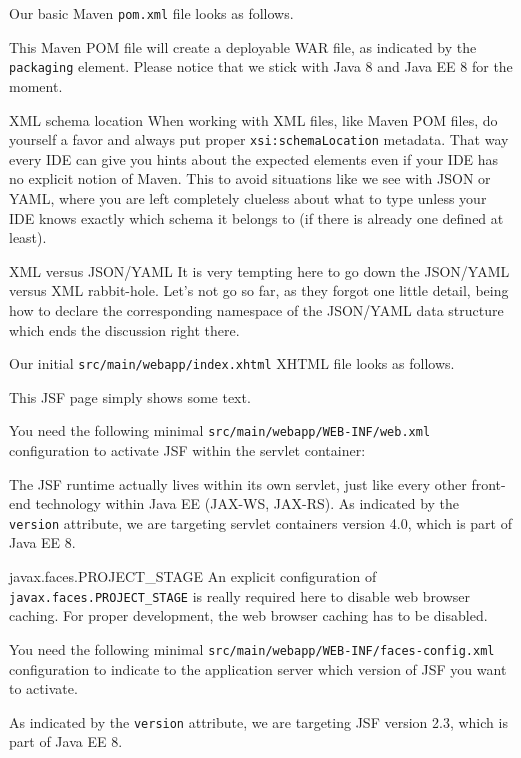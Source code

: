 Our basic Maven \cite{ApacheMaven} \texttt{pom.xml} file looks as follows.

This Maven POM file will create a deployable WAR file, as indicated by the \texttt{packaging} element.
Please notice that we stick with Java 8 \cite{GoslingJoyEtAl14} and Java EE 8 \cite{JavaEE8} for the moment.

\begin{TIP}{XML schema location}
	When working with XML files, like Maven POM files, do yourself a favor and always put proper \texttt{xsi:schemaLocation} metadata.
	That way every IDE can give you hints about the expected elements even if your IDE has no explicit notion of Maven.
	This to avoid situations like we see with JSON or YAML, where you are left completely clueless about what to type unless your IDE knows exactly which schema it belongs to (if there is already one defined at least).
\end{TIP}

\begin{ClownComputing}{XML versus JSON/YAML}
	It is very tempting here to go down the JSON/YAML versus XML rabbit-hole.
	Let's not go so far, as they forgot one little detail, being how to declare the corresponding namespace of the JSON/YAML data structure which ends the discussion right there.
\end{ClownComputing}

Our initial \texttt{src/main/webapp/index.xhtml} XHTML file looks as follows.

This JSF page simply shows some text.

You need the following minimal \texttt{src/main/webapp/WEB-INF/web.xml} configuration to activate JSF within the servlet container:

The JSF runtime actually lives within its own servlet, just like every other front-end technology within Java EE (JAX-WS, JAX-RS).
As indicated by the \texttt{version} attribute, we are targeting servlet containers version 4.0, which is part of Java EE 8.
\begin{TIP}{javax.faces.PROJECT\_STAGE}
An explicit configuration of \texttt{javax.faces.PROJECT\_STAGE} is really required here to disable web browser caching.
For proper development, the web browser caching has to be disabled.
\end{TIP}

You need the following minimal \texttt{src/main/webapp/WEB-INF/faces-config.xml} configuration to indicate to the application server which version of JSF you want to activate.

As indicated by the \texttt{version} attribute, we are targeting JSF version 2.3, which is part of Java EE 8.

